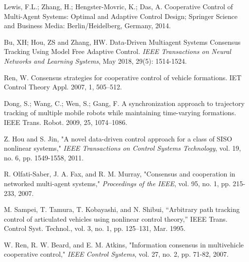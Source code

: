 \documentclass[journal,onecolumn]{IEEEtran}
\begin{document}





\begin{thebibliography}{99}


    Lewis, F.L.; Zhang, H.; Hengster-Movric, K.; Das, A. Cooperative Control of Multi-Agent Systems: Optimal and Adaptive Control
    Design; Springer Science and Business Media: Berlin/Heidelberg, Germany, 2014.
    
    Bu, XH; Hou, ZS and Zhang, HW. Data-Driven Multiagent Systems Consensus Tracking Using Model Free Adaptive Control. \textit{IEEE Transactions on Neural Networks and Learning Systems}, May 2018, 29(5): 1514-1524.

    Ren, W. Consensus strategies for cooperative control of vehicle formations. IET Control Theory Appl. 2007, 1, 505–512.

    Dong, S.; Wang, C.; Wen, S.; Gang, F. A synchronization approach to trajectory tracking of multiple mobile robots while
    maintaining time-varying formations. IEEE Trans. Robot. 2009, 25, 1074–1086.
    
    Z. Hou and S. Jin, "A novel data-driven control approach for a class of SISO nonlinear systems," \textit{IEEE Transactions on Control Systems Technology}, vol. 19, no. 6, pp. 1549-1558, 2011.
    
    R. Olfati-Saber, J. A. Fax, and R. M. Murray, "Consensus and cooperation in networked multi-agent systems," \textit{Proceedings of the IEEE}, vol. 95, no. 1, pp. 215-233, 2007.
    
    M. Sampei, T. Tamura, T. Kobayashi, and N. Shibui, “Arbitrary path
    tracking control of articulated vehicles using nonlinear control theory,”
    IEEE Trans. Control Syst. Technol., vol. 3, no. 1, pp. 125–131, Mar. 1995.
    
    W. Ren, R. W. Beard, and E. M. Atkins, "Information consensus in multivehicle cooperative control," \textit{IEEE Control Systems}, vol. 27, no. 2, pp. 71-82, 2007.
    

\end{thebibliography}
\end{document}

